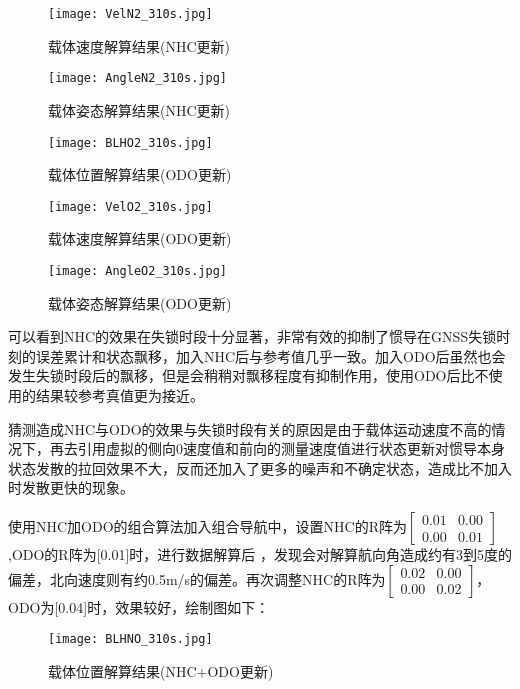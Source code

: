 \documentclass[codepkg=listings,theme=fancy]{course-report}
\begin{document}
\begin{figure}[H]
\texttt{[image: VelN2\_310s.jpg]}
\caption{载体速度解算结果(NHC更新)}
\end{figure}

\begin{figure}[H]
\texttt{[image: AngleN2\_310s.jpg]}
\caption{载体姿态解算结果(NHC更新)}
\end{figure}

\begin{figure}[H]
\texttt{[image: BLHO2\_310s.jpg]}
\caption{载体位置解算结果(ODO更新)}
\end{figure}

\begin{figure}[H]
\texttt{[image: VelO2\_310s.jpg]}
\caption{载体速度解算结果(ODO更新)}
\end{figure}

\begin{figure}[H]
\texttt{[image: AngleO2\_310s.jpg]}
\caption{载体姿态解算结果(ODO更新)}
\end{figure}

可以看到NHC的效果在失锁时段十分显著，非常有效的抑制了惯导在GNSS失锁时刻的误差累计和状态飘移，加入NHC后与参考值几乎一致。加入ODO后虽然也会发生失锁时段后的飘移，但是会稍稍对飘移程度有抑制作用，使用ODO后比不使用的结果较参考真值更为接近。

猜测造成NHC与ODO的效果与失锁时段有关的原因是由于载体运动速度不高的情况下，再去引用虚拟的侧向0速度值和前向的测量速度值进行状态更新对惯导本身状态发散的拉回效果不大，反而还加入了更多的噪声和不确定状态，造成比不加入时发散更快的现象。

使用NHC加ODO的组合算法加入组合导航中，设置NHC的R阵为$\left[\begin{array}{cc}0.01&0.00\\0.00&0.01\end{array}\right]$,ODO的R阵为[0.01]时，进行数据解算后 ，发现会对解算航向角造成约有3到5度的偏差，北向速度则有约0.5m/s的偏差。再次调整NHC的R阵为$\left[\begin{array}{cc}0.02&0.00\\0.00&0.02\end{array}\right]$，ODO为[0.04]时，效果较好，绘制图如下：
\begin{figure}[H]
\texttt{[image: BLHNO\_310s.jpg]}
\caption{载体位置解算结果(NHC+ODO更新)}
\end{figure}
\end{document}
